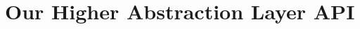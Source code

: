 \section{Our Higher Abstraction Layer API}\label{sec:abstraction_layer}
\begin{sectionmeta}
\end{sectionmeta}